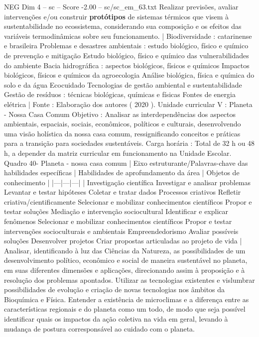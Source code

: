 \begin{textsample}{NEG Dim 4 – sc – Score -2.00 – sc/sc\_em\_63.txt}
Realizar previsões, avaliar intervenções e/ou construir \textbf{protótipos} de sistemas térmicos que visem à sustentabilidade no ecossistema, considerando sua composição e os efeitos das variáveis termodinâmicas sobre seu funcionamento. | Biodiversidade : catarinense e brasileira Problemas e desastres ambientais : estudo biológico, físico e químico de prevenção e mitigação Estudo biológico, físico e químico das vulnerabilidades do ambiente Bacia hidrográfica : aspectos biológicos, físicos e químicos Impactos biológicos, físicos e químicos da agroecologia Análise biológica, física e química do solo e da água Ecocuidado Tecnologias de gestão ambiental e sustentabilidade Gestão de resíduos : técnicas biológicas, químicas e físicas Fontes de energia elétrica | Fonte : Elaboração dos autores ( 2020 ).
Unidade curricular V : Planeta - Nossa Casa Comum Objetivo : Analisar as interdependências dos aspectos ambientais, espaciais, sociais, econômicos, políticos e culturais, desenvolvendo uma visão holística da nossa casa comum, ressignificando conceitos e práticas para a transição para sociedades sustentáveis.
Carga horária : Total de 32 h ou 48 h, a depender da matriz curricular em funcionamento na Unidade Escolar.
Quadro 40- Planeta - nossa casa comum | Eixo estruturante/Palavras-chave das habilidades específicas | Habilidades de aprofundamento da área | Objetos de conhecimento | |---|---|---| | Investigação científica Investigar e analisar problemas Levantar e testar hipóteses Coletar e tratar dados Processos criativos Refletir criativa/cientificamente Selecionar e mobilizar conhecimentos científicos Propor e testar soluções Mediação e intervenção sociocultural Identificar e explicar fenômenos Selecionar e mobilizar conhecimentos científicos Propor e testar intervenções socioculturais e ambientais Empreendedorismo Avaliar possíveis soluções Desenvolver projetos Criar propostas articuladas ao projeto de vida | Analisar, identificando à luz das Ciências da Natureza, as possibilidades de um desenvolvimento político, econômico e social de maneira sustentável no planeta, em suas diferentes dimensões e aplicações, direcionando assim à proposição e à resolução dos problemas apontados.
Utilizar as tecnologias existentes e vislumbrar possibilidades de evolução e criação de novas tecnologias nos âmbitos da Bioquímica e Física.
Entender a existência de microclimas e a diferença entre as características regionais e do planeta como um todo, de modo que seja possível identificar quais os impactos da ação coletiva na vida em geral, levando à mudança de postura corresponsável ao cuidado com o planeta.

\end{textsample}
